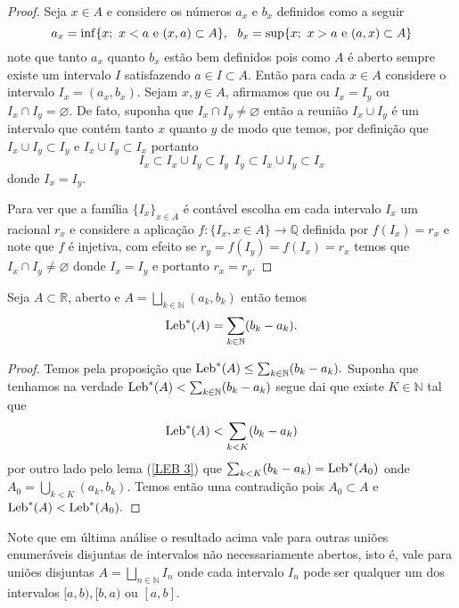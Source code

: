\begin{proof}
Seja $x\in A$  e considere os números $a_x$ e $b_x$ 
definidos como a seguir
$$
a_x
=
\inf\{x;~x<a~\textnormal{e}~(x,a)\subset A\},~~b_x
=
\sup \{x;~x>a~\textnormal{e}~(a,x)\subset A\}
$$
note que  tanto $a_x$ quanto $b_x$ estão bem definidos 
pois como $A$ é  aberto sempre existe um intervalo $I$ 
satisfazendo $a\in I\subset A$. 
Então para cada $x\in A$ considere o intervalo 
$I_x=(a_x,b_x)$. Sejam $x,y\in A$, afirmamos que ou $I_x=I_y$ 
ou $I_x\cap I_y=\varnothing.$ 
De fato, suponha que $I_x\cap I_y\neq \varnothing$ 
então a reunião $I_x\cup I_y$ é um intervalo que 
contém tanto $x$ quanto $y$ de modo que temos, 
por definição que $  I_ x\cup I_y\subset I_y$ 
e $I_x\cup I_y\subset I_x$ portanto 
$$
I_x\subset I_x\cup I_y\subset I_y~~ I_y\subset I_x\cup I_y\subset I_x
$$
donde $I_x=I_y$.



Para ver que a família $\{I_x\}_{x\in A}$ é 
contável escolha em cada intervalo $I_x$ um 
racional $r_x$ e considere a aplicação  
$f:\{I_x,x\in A\}\to \mathbb{Q}$ definida por 
$f(I_x)=r_x$ e note que $f$ é injetiva, com efeito se 
$r_y=f(I_y)=f(I_x)=r_x$ temos que 
$I_x\cap I_y\neq \varnothing$ donde $I_x=I_y$ e portanto $r_x=r_y$.

\end{proof}




\begin{lema}\label{LEB 4}
Seja $A\subset \mathbb{R}$,  aberto e 
$A=\bigsqcup_{k\in \mathbb{N}}(a_k,b_k)$ então temos 
$$
\textnormal{Leb}^{*}(A)=\sum_{k\in \mathbb{N}}(b_k-a_k).
$$
\end{lema}

\begin{proof}
Temos pela proposição  que 
$\textnormal{Leb}^{*}(A)\leq \sum_{k\in \mathbb{N}}(b_k-a_k).$ 
Suponha que tenhamos na verdade 
$\textnormal{Leb}^{*}(A)< \sum_{k\in \mathbb{N}}(b_k-a_k)$ 
segue dai que existe $K\in \mathbb{N}$ tal que 
$$
\textnormal{Leb}^{*}(A)< \sum_{k<K}(b_k-a_k)
$$
 por outro lado pelo lema (\ref{LEB 3}) 
 que $\sum_{k<K}(b_k-a_k)=\textnormal{Leb}^{*}(A_0)$ 
 onde $A_0=\bigcup_{k<K}(a_k,b_k)$.
Temos então uma contradição pois 
$A_0\subset A$ e $\textnormal{Leb}^{*}(A)<\textnormal{Leb}^{*}(A_0).$
\end{proof}

Note que em última análise o resultado acima 
vale para outras uniões enumeráveis disjuntas 
de intervalos não necessariamente abertos, 
isto é, vale para uniões disjuntas 
$A=\bigsqcup_{n\in\mathbb{N}} I_n$ onde 
cada intervalo $I_n$ pode ser qualquer um 
dos intervalos $[a,b),[b,a)$ ou $[a,b]$. 



